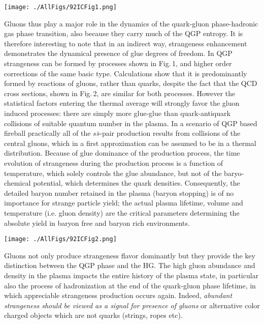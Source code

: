 \begin{mdframed}[linecolor=gray,roundcorner=12pt,backgroundcolor=Dandelion!15,linewidth=1pt,leftmargin=0cm,rightmargin=0cm,topline=true,bottomline=true,skipabove=12pt]
\centerline{\texttt{[image: ./AllFigs/92ICFig1.png]} }
{}

Gluons thus play a major role in the dynamics of the quark-gluon
phase-hadronic gas phase transition, also because they carry much of the 
QGP entropy. It is therefore interesting to note that in an indirect way,
strangeness enhancement demonstrates the dynamical presence of glue
degrees of freedom. In QGP strangeness can be formed by processes shown
in Fig.\,1, and higher order corrections of the same basic type.
Calculations show that it is predominantly formed by reactions of gluons,
rather than quarks, despite the fact that the QCD cross sections, shown
in Fig.\,2, are similar for both processes. However the
statistical
factors entering the thermal average will strongly favor the gluon
induced processes: there are simply more glue-glue than quark-antiquark
collisions of suitable quantum number in the plasma. In a scenario of QGP
based fireball practically all of the $s{\bar s}$-pair production results
from collisions of the central gluons, which in a first approximation can
be assumed to be in a thermal distribution. Because of glue dominance of
the production process, the time evolution of strangeness during the
production process is a function of temperature, which solely controls
the glue abundance, but not of the baryo-chemical potential, which
determines the quark densities. Consequently, the detailed baryon number
retained in the plasma (baryon stopping) is of no importance for strange
particle yield; the actual plasma lifetime, volume and temperature (i.e.
gluon density) are the critical parameters  determining the absolute
yield in baryon free and baryon rich environments.
 
\centerline{\texttt{[image: ./AllFigs/92ICFig2.png]}}
{}

Gluons not only produce strangeness flavor dominantly but they provide
the key distinction between the QGP phase and the HG. The high gluon
abundance and density in the plasma impacts the entire history of the
plasma state, in particular also the process of hadronization at the end
of the quark-gluon phase lifetime, in which appreciable strangeness
production occurs again. Indeed, {\it abundant strangeness should be
viewed  as a signal for presence of gluons} or alternative color charged
objects which are not quarks (strings, ropes etc). 
%

\end{mdframed}
